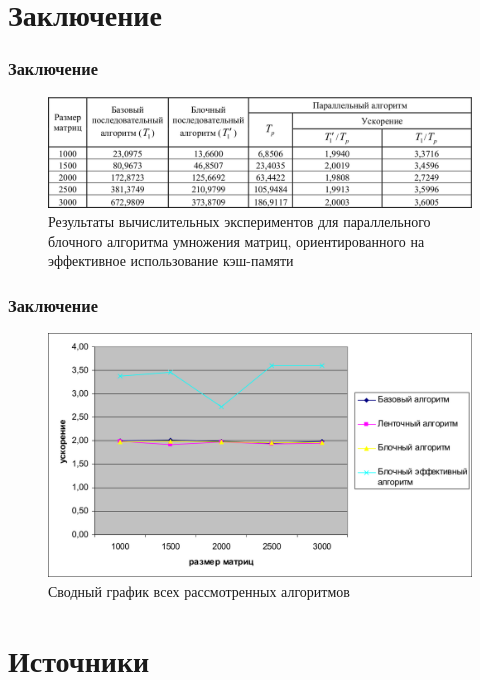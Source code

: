 \documentclass{beamer}
\begin{document}
\section{Заключение}

\begin{frame}
\frametitle{Заключение}

\begin{figure}
\includegraphics[scale=0.25]{res/pic018}
\caption{Результаты вычислительных экспериментов для параллельного блочного алгоритма умножения матриц, ориентированного на эффективное использование кэш-памяти}
\end{figure}

\end{frame}


\begin{frame}
\frametitle{Заключение}

\begin{figure}
\includegraphics[scale=0.30]{res/pic019}
\caption{Сводный график всех рассмотренных алгоритмов}
\end{figure}

\end{frame}

\section{Источники}
\end{document}
